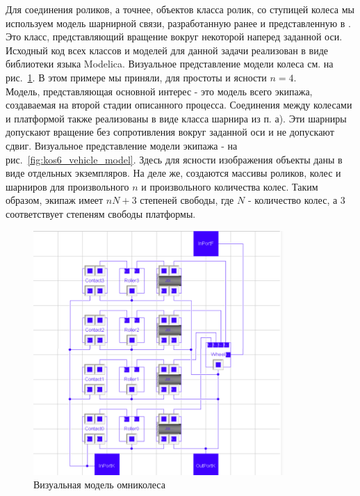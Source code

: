 \documentclass[12pt]{article}
\begin{document}
Для соединения роликов, а точнее, объектов класса ролик, со ступицей колеса мы используем модель шарнирной связи, разработанную ранее и представленную в \cite{kos5}. Это класс, представляющий вращение вокруг некоторой наперед заданной оси. Исходный код всех классов и моделей для данной задачи реализован в виде библиотеки языка Modelica. Визуальное представление модели колеса см. на рис.~\ref{fig:kos5_wheel_model}. В этом примере мы приняли, для простоты и ясности $n = 4$.\\

Модель, представляющая основной интерес - это модель всего экипажа, создаваемая на второй стадии описанного процесса. Соединения между колесами и платформой также реализованы в виде класса шарнира из п. а). Эти шарниры допускают вращение без сопротивления вокруг заданной оси и не допускают сдвиг. Визуальное представление модели экипажа - на рис.~\ref{fig:kos6_vehicle_model}. Здесь для ясности изображения объекты даны в виде отдельных экземпляров. На деле же, создаются массивы роликов, колес и шарниров для произвольного $n$ и произвольного количества колес. Таким образом, экипаж имеет $nN+3$ степеней свободы, где $N$ - количество колес, а $3$ соответствует степеням свободы платформы.\\

\begin{figure}[h!]
    \centering
    \includegraphics[width=0.85\textwidth]{img/art/kos5_wheel_model.png}
    \caption{Визуальная модель омниколеса}
    \label{fig:kos5_wheel_model}
\end{figure}
\end{document}

